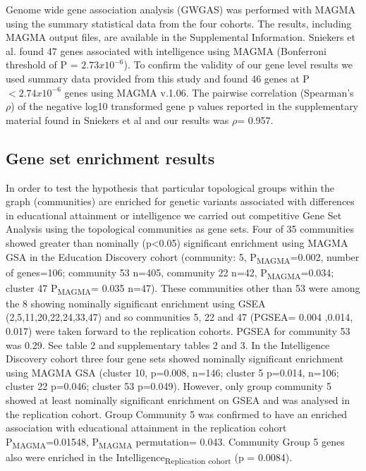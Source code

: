Genome wide gene association analysis (GWGAS) was performed with MAGMA using the summary statistical data from the four cohorts. The results, including MAGMA output files, are available in the Supplemental Information.
Sniekers et al. found 47 genes associated with intelligence using MAGMA (Bonferroni threshold of P = $2.73 x 10^{-6}$). \cite{sniekers2017genome}  To confirm the validity of our gene level results we used summary data provided from this study and found 46 genes at  P$<2.74 x 10^{-6}$ genes using MAGMA v.1.06.  The pairwise correlation (Spearman’s $\rho$) of the negative log10 transformed gene p values reported in the supplementary material found in Sniekers et al and our results was $\rho$= 0.957. \cite{sniekers2017genome} 



\subsection{Gene set enrichment results}
In order to test the hypothesis that particular topological groups within the graph (communities) are enriched for genetic variants associated with differences in educational attainment or intelligence we carried out competitive Gene Set Analysis using the topological communities as gene sets. 
Four of 35 communities showed greater than nominally (p<0.05) significant enrichment using MAGMA GSA in the Education Discovery cohort (community: 5, P\textsubscript{MAGMA}=0.002, number of genes=106; community 53 n=405, community 22 n=42, P\textsubscript{MAGMA}=0.034; cluster 47 P\textsubscript{MAGMA}= 0.035 n=47). These communities other than 53 were among the 8 showing nominally significant enrichment using GSEA (2,5,11,20,22,24,33,47) and so communities 5, 22 and 47 (PGSEA= 0.004 ,0.014, 0.017) were taken forward to the replication cohorts. PGSEA for community 53 was 0.29. See table 2 and supplementary tables 2 and 3.
In the Intelligence Discovery cohort three four gene sets showed nominally significant enrichment using MAGMA GSA (cluster 10, p=0.008, n=146; cluster 5 p=0.014, n=106; cluster 22 p=0.046; cluster 53 p=0.049). However, only group community 5 showed at least nominally significant enrichment on GSEA and was analysed in the replication cohort. 
Group Community 5 was confirmed to have an enriched association with educational attainment in the replication cohort P\textsubscript{MAGMA}=0.01548, P\textsubscript{MAGMA} permutation= 0.043. Community Group 5 genes also were enriched in the Intelligence\textsubscript{Replication cohort} (p = 0.0084).

